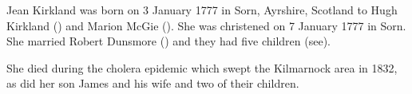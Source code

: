 
Jean Kirkland was born on 3 January 1777 in	Sorn, Ayrshire, Scotland \cite{JKirklandBirth} to Hugh Kirkland () and Marion McGie (). She was christened on 7 January 1777 in Sorn.
She married Robert Dunsmore () and they had five children (see). 

She died during the cholera epidemic which swept the Kilmarnock area in 1832, as did her son James and his wife and two of their children.\cite{RDunsmoreDeath}


